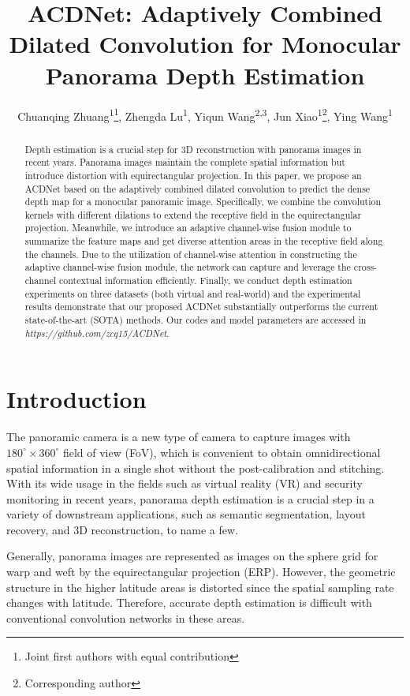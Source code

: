 \documentclass[letterpaper]{article} \usepackage{aaai21}  \usepackage{times}  \usepackage{helvet} \usepackage{courier}  \usepackage[hyphens]{url}  \usepackage{graphicx} \urlstyle{rm} \def\UrlFont{\rm}  \usepackage{natbib}  \usepackage{caption} \frenchspacing  \setlength{\pdfpagewidth}{8.5in}  \setlength{\pdfpageheight}{11in}
\title{ACDNet: Adaptively Combined Dilated Convolution for Monocular Panorama Depth Estimation}
\author {
    Chuanqing Zhuang\textsuperscript{\rm 1}\footnote{Joint first authors with equal contribution},
    Zhengda Lu\textsuperscript{\rm 1}\footnotemark[1],
    Yiqun Wang\textsuperscript{\rm 2,3},
    Jun Xiao\textsuperscript{\rm 1}\footnote{Corresponding author},
    Ying Wang\textsuperscript{\rm 1}\\
}
\begin{document}
\maketitle

\begin{abstract}
Depth estimation is a crucial step for 3D reconstruction with panorama images in recent years. Panorama images maintain the complete spatial information but introduce distortion with equirectangular projection. In this paper, we propose an ACDNet based on the adaptively combined dilated convolution to predict the dense depth map for a monocular panoramic image. Specifically, we combine the convolution kernels with different dilations to extend the receptive field in the equirectangular projection. Meanwhile, we introduce an adaptive channel-wise fusion module to summarize the feature maps and get diverse attention areas in the receptive field along the channels. Due to the utilization of channel-wise attention in constructing the adaptive channel-wise fusion module, the network can capture and leverage the cross-channel contextual information efficiently. Finally, we conduct depth estimation experiments on three datasets (both virtual and real-world) and the experimental results demonstrate that our proposed ACDNet substantially outperforms the current state-of-the-art (SOTA) methods. Our codes and model parameters are accessed in \textit{https://github.com/zcq15/ACDNet}.

\end{abstract}

\section{Introduction}

The panoramic camera is a new type of camera to capture images with $180^\circ\times360^\circ$ field of view (FoV), which is convenient to obtain omnidirectional spatial information in a single shot without the post-calibration and stitching. 
With its wide usage in the fields such as virtual reality (VR) and security monitoring in recent years,
panorama depth estimation is a crucial step in a variety of downstream applications, such as semantic segmentation, layout recovery, and 3D reconstruction, to name a few. 

Generally, panorama images are represented as images on the sphere grid for warp and weft by the equirectangular projection (ERP). However, the geometric structure in the higher latitude areas is distorted since the spatial sampling rate changes with latitude.
Therefore, accurate depth estimation is difficult with conventional convolution networks in these areas.
\end{document}
